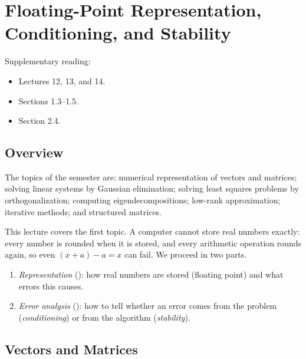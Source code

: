 \chapter{Floating-Point Representation, Conditioning, and Stability}
\label{ch:fp}

Supplementary reading:
\begin{itemize}
  \item \cite{TB} Lectures 12, 13, and 14.
  \item \cite{Demmel} Sections 1.3--1.5.
  \item \cite{GVL} Section 2.4.
\end{itemize}

\section{Overview}

The topics of the semester are: numerical representation of vectors and matrices; solving linear systems by Gaussian elimination; solving least squares problems by orthogonalization; computing eigendecompositions; low-rank approximation; iterative methods; and structured matrices.

This lecture covers the first topic. A computer cannot store real numbers exactly: every number is rounded when it is stored, and every arithmetic operation rounds again, so even $(x + a) - a = x$ can fail. We proceed in two parts.
\begin{enumerate}
  \item \emph{Representation} (): how real numbers are stored (floating point) and what errors this causes.
  \item \emph{Error analysis} (): how to tell whether an error comes from the problem (\emph{conditioning}) or from the algorithm (\emph{stability}).
\end{enumerate}

\section{Vectors and Matrices}

